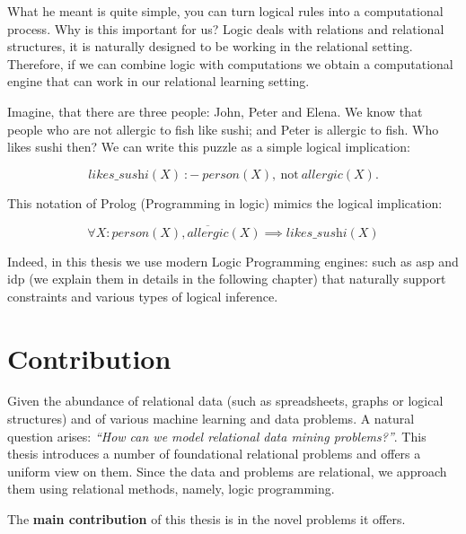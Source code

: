 What he meant is quite simple, you can turn logical rules into a
computational process. Why is this important for us? Logic deals with
relations and relational structures, it is naturally designed to be
working in the relational setting. Therefore, if we can combine logic
with computations we obtain a computational engine that can work in
our relational learning setting.


Imagine, that there are three people: John, Peter and Elena. We know
that people who are not allergic to fish like sushi; and Peter is
allergic to fish. Who likes sushi then? We can write this puzzle as a
simple logical implication:

\begin{equation*}
  \textit{likes\_sushi}(X)~{:}{-}~\textit{person}(X),~\text{not}~
  \textit{allergic}(X). 
\end{equation*}

This notation of Prolog (Programming in logic) mimics the logical implication:

\begin{equation*}
  \forall X: \textit{person}(X), \overline{\textit{allergic}}(X)
  \implies \textit{likes\_sushi}(X)
\end{equation*}

Indeed, in this thesis we use modern Logic Programming engines: such
as \acrlong{asp} \cite{ASPbook,whatisasp} and \acrlong{idp}
\parencite{idp} (we explain them in details in the following chapter)
that naturally support constraints and various types of logical
inference.


\section{Contribution}
Given the abundance of relational data (such as spreadsheets, graphs
or logical structures) and of various machine learning and data
problems. A natural question arises: \textit{``How can we model
relational data mining problems?''}. This thesis introduces a number
of foundational relational problems and offers a uniform view on them.
Since the data and problems are relational, we approach them using
relational methods, namely, logic programming.

The \textbf{main contribution} of this thesis is in the novel problems
it offers.

